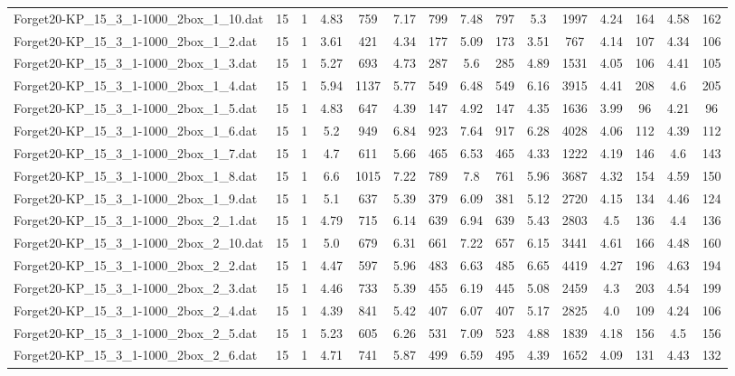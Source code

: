 \begin{table}[!ht]
{\begin{tabular}{lcccccccccccccc}
Forget20-KP\_15\_3\_1-1000\_2box\_1\_10.dat & 15 & 1 & 4.83 & 759 & 7.17 & 799 & 7.48 & 797 & 5.3 & 1997 & 4.24 & 164 & 4.58 & 162 \\
Forget20-KP\_15\_3\_1-1000\_2box\_1\_2.dat & 15 & 1 & 3.61 & 421 & 4.34 & 177 & 5.09 & 173 & 3.51 & 767 & 4.14 & 107 & 4.34 & 106 \\
Forget20-KP\_15\_3\_1-1000\_2box\_1\_3.dat & 15 & 1 & 5.27 & 693 & 4.73 & 287 & 5.6 & 285 & 4.89 & 1531 & 4.05 & 106 & 4.41 & 105 \\
Forget20-KP\_15\_3\_1-1000\_2box\_1\_4.dat & 15 & 1 & 5.94 & 1137 & 5.77 & 549 & 6.48 & 549 & 6.16 & 3915 & 4.41 & 208 & 4.6 & 205 \\
Forget20-KP\_15\_3\_1-1000\_2box\_1\_5.dat & 15 & 1 & 4.83 & 647 & 4.39 & 147 & 4.92 & 147 & 4.35 & 1636 & 3.99 & 96 & 4.21 & 96 \\
Forget20-KP\_15\_3\_1-1000\_2box\_1\_6.dat & 15 & 1 & 5.2 & 949 & 6.84 & 923 & 7.64 & 917 & 6.28 & 4028 & 4.06 & 112 & 4.39 & 112 \\
Forget20-KP\_15\_3\_1-1000\_2box\_1\_7.dat & 15 & 1 & 4.7 & 611 & 5.66 & 465 & 6.53 & 465 & 4.33 & 1222 & 4.19 & 146 & 4.6 & 143 \\
Forget20-KP\_15\_3\_1-1000\_2box\_1\_8.dat & 15 & 1 & 6.6 & 1015 & 7.22 & 789 & 7.8 & 761 & 5.96 & 3687 & 4.32 & 154 & 4.59 & 150 \\
Forget20-KP\_15\_3\_1-1000\_2box\_1\_9.dat & 15 & 1 & 5.1 & 637 & 5.39 & 379 & 6.09 & 381 & 5.12 & 2720 & 4.15 & 134 & 4.46 & 124 \\
Forget20-KP\_15\_3\_1-1000\_2box\_2\_1.dat & 15 & 1 & 4.79 & 715 & 6.14 & 639 & 6.94 & 639 & 5.43 & 2803 & 4.5 & 136 & 4.4 & 136 \\
Forget20-KP\_15\_3\_1-1000\_2box\_2\_10.dat & 15 & 1 & 5.0 & 679 & 6.31 & 661 & 7.22 & 657 & 6.15 & 3441 & 4.61 & 166 & 4.48 & 160 \\
Forget20-KP\_15\_3\_1-1000\_2box\_2\_2.dat & 15 & 1 & 4.47 & 597 & 5.96 & 483 & 6.63 & 485 & 6.65 & 4419 & 4.27 & 196 & 4.63 & 194 \\
Forget20-KP\_15\_3\_1-1000\_2box\_2\_3.dat & 15 & 1 & 4.46 & 733 & 5.39 & 455 & 6.19 & 445 & 5.08 & 2459 & 4.3 & 203 & 4.54 & 199 \\
Forget20-KP\_15\_3\_1-1000\_2box\_2\_4.dat & 15 & 1 & 4.39 & 841 & 5.42 & 407 & 6.07 & 407 & 5.17 & 2825 & 4.0 & 109 & 4.24 & 106 \\
Forget20-KP\_15\_3\_1-1000\_2box\_2\_5.dat & 15 & 1 & 5.23 & 605 & 6.26 & 531 & 7.09 & 523 & 4.88 & 1839 & 4.18 & 156 & 4.5 & 156 \\
Forget20-KP\_15\_3\_1-1000\_2box\_2\_6.dat & 15 & 1 & 4.71 & 741 & 5.87 & 499 & 6.59 & 495 & 4.39 & 1652 & 4.09 & 131 & 4.43 & 132 \\

\end{tabular}}
\end{table}
